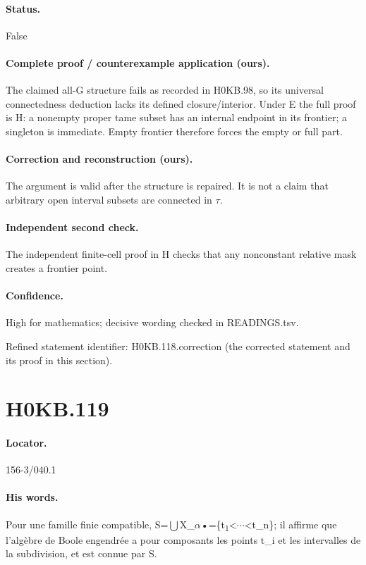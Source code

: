 \paragraph{Status.} False

\paragraph{Complete proof / counterexample application (ours).} The claimed all-G structure fails as recorded in H0KB.98, so its universal connectedness deduction lacks its defined closure/interior. Under E the full proof is H: a nonempty proper tame subset has an internal endpoint in its frontier; a singleton is immediate. Empty frontier therefore forces the empty or full part.

\paragraph{Correction and reconstruction (ours).} The argument is valid after the structure is repaired. It is not a claim that arbitrary open interval subsets are connected in \ensuremath{\tau}.

\paragraph{Independent second check.} The independent finite-cell proof in H checks that any nonconstant relative mask creates a frontier point.

\paragraph{Confidence.} High for mathematics; decisive wording checked in READINGS.tsv.

\noindent Refined statement identifier: H0KB.118.correction (the corrected statement and its proof in this section).

\section*{H0KB.119}\label{statement:H0KB.119}
\paragraph{Locator.} 156-3/040.1

\paragraph{His words.} Pour une famille finie compatible, S=\ensuremath{\bigcup}X\_\ensuremath{\alpha}•=\{t\textsubscript{1}<\ensuremath{\cdots}<t\_n\}; il affirme que l’algèbre de Boole engendrée a pour composants les points t\_i et les intervalles de la subdivision, et est connue par S.

